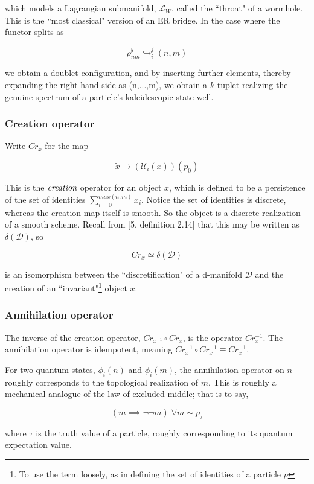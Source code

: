 \documentclass{article}
\begin{document}
	which models a Lagrangian submanifold, $\mathcal{L}_W$, called the ``throat" of a wormhole. This is the ``most classical" version of an ER bridge. In the case where the functor splits as
	
	$$\rho_{nm}^\flat \hookrightarrow_i^j (n,m)$$
	
	we obtain a doublet configuration, and by inserting further elements, thereby expanding the right-hand side as (n,...,m), we obtain a $k$-tuplet realizing the genuine spectrum of a particle's kaleidescopic state well.
	
	\subsubsection{Creation operator}
	Write $Cr_x$ for the map
	
	$$\tilde{x} \longrightarrow (\mathcal{U}_i(x))(p_0)$$
	
	This is the $\emph{creation}$ operator for an object $x$, which is defined to be a persistence of the set of identities $\sum_{i=0}^{max(n,m)} x_i$. Notice the set of identities is discrete, whereas the creation map itself is smooth. So the object is a discrete realization of a smooth scheme. Recall from [5, definition 2.14] that this may be written as $\delta(\mathcal{D})$, so
	
	$$Cr_x \simeq \delta(\mathcal{D})$$
	
	is an isomorphism between the ``discretification" of a d-manifold $\mathcal{D}$ and the creation of an ``invariant"\footnote{To use the term loosely, as in defining the set of identities of a particle $p$} object $x$.
	
	\subsubsection{Annihilation operator}
	The inverse of the creation operator, $Cr_{x^{-1}} \circ Cr_x$, is the operator $Cr_x^{-1}$. The annihilation operator is idempotent, meaning $Cr_x^{-1} \circ Cr_x^{-1} \equiv Cr_x^{-1}$.
	
	For two quantum states, $\phi_i(n)$ and $\phi_i(m)$, the annihilation operator on $n$ roughly corresponds to the topological realization of $m$. This is roughly a mechanical analogue of the law of excluded middle; that is to say, 
	
	$$(m \implies \neg\neg m) \; \forall m \sim p_\tau$$
	
	where $\tau$ is the truth value of a particle, roughly corresponding to its quantum expectation value.
	
\end{document}
